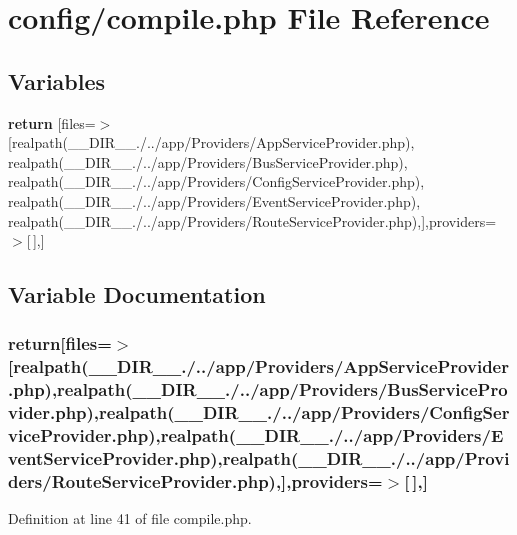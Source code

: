 \section{config/compile.php File Reference}
\label{compile_8php}
\subsection*{Variables}
\begin{DoxyCompactItemize}
\item 
{\bf return} [\textquotesingle{}files\textquotesingle{}=$>$[realpath(\+\_\+\+\_\+\+D\+I\+R\+\_\+\+\_\+.\textquotesingle{}/../app/Providers/App\+Service\+Provider.\+php\textquotesingle{}), realpath(\+\_\+\+\_\+\+D\+I\+R\+\_\+\+\_\+.\textquotesingle{}/../app/Providers/Bus\+Service\+Provider.\+php\textquotesingle{}), realpath(\+\_\+\+\_\+\+D\+I\+R\+\_\+\+\_\+.\textquotesingle{}/../app/Providers/Config\+Service\+Provider.\+php\textquotesingle{}), realpath(\+\_\+\+\_\+\+D\+I\+R\+\_\+\+\_\+.\textquotesingle{}/../app/Providers/Event\+Service\+Provider.\+php\textquotesingle{}), realpath(\+\_\+\+\_\+\+D\+I\+R\+\_\+\+\_\+.\textquotesingle{}/../app/Providers/Route\+Service\+Provider.\+php\textquotesingle{}),],\textquotesingle{}providers\textquotesingle{}=$>$[$\,$],]
\end{DoxyCompactItemize}


\subsection{Variable Documentation}
\subsubsection[{return}]{\setlength{\rightskip}{0pt plus 5cm}return[\textquotesingle{}files\textquotesingle{}=$>$[realpath(\+\_\+\+\_\+\+D\+I\+R\+\_\+\+\_\+.\textquotesingle{}/../app/Providers/App\+Service\+Provider.\+php\textquotesingle{}),realpath(\+\_\+\+\_\+\+D\+I\+R\+\_\+\+\_\+.\textquotesingle{}/../app/Providers/Bus\+Service\+Provider.\+php\textquotesingle{}),realpath(\+\_\+\+\_\+\+D\+I\+R\+\_\+\+\_\+.\textquotesingle{}/../app/Providers/Config\+Service\+Provider.\+php\textquotesingle{}),realpath(\+\_\+\+\_\+\+D\+I\+R\+\_\+\+\_\+.\textquotesingle{}/../app/Providers/Event\+Service\+Provider.\+php\textquotesingle{}),realpath(\+\_\+\+\_\+\+D\+I\+R\+\_\+\+\_\+.\textquotesingle{}/../app/Providers/Route\+Service\+Provider.\+php\textquotesingle{}),],\textquotesingle{}providers\textquotesingle{}=$>$[$\,$],]}\label{compile_8php_a4aeb789f5eab2ca22be91cfdb3a59e33}


Definition at line 41 of file compile.\+php.

